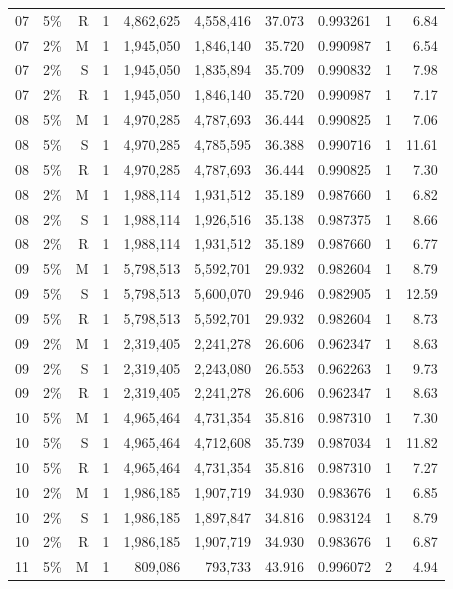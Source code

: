 \documentclass[10pt,a4paper]{article}
\begin{document}
\begin{longtable}{llrlrrrlrr}
07 & 5\% & R & 1 & 4,862,625 & 4,558,416 & 37.073 & 0.993261 & 1 & 6.84 \\
07 & 2\% & M & 1 & 1,945,050 & 1,846,140 & 35.720 & 0.990987 & 1 & 6.54 \\
07 & 2\% & S & 1 & 1,945,050 & 1,835,894 & 35.709 & 0.990832 & 1 & 7.98 \\
07 & 2\% & R & 1 & 1,945,050 & 1,846,140 & 35.720 & 0.990987 & 1 & 7.17 \\
08 & 5\% & M & 1 & 4,970,285 & 4,787,693 & 36.444 & 0.990825 & 1 & 7.06 \\
08 & 5\% & S & 1 & 4,970,285 & 4,785,595 & 36.388 & 0.990716 & 1 & 11.61 \\
08 & 5\% & R & 1 & 4,970,285 & 4,787,693 & 36.444 & 0.990825 & 1 & 7.30 \\
08 & 2\% & M & 1 & 1,988,114 & 1,931,512 & 35.189 & 0.987660 & 1 & 6.82 \\
08 & 2\% & S & 1 & 1,988,114 & 1,926,516 & 35.138 & 0.987375 & 1 & 8.66 \\
08 & 2\% & R & 1 & 1,988,114 & 1,931,512 & 35.189 & 0.987660 & 1 & 6.77 \\
09 & 5\% & M & 1 & 5,798,513 & 5,592,701 & 29.932 & 0.982604 & 1 & 8.79 \\
09 & 5\% & S & 1 & 5,798,513 & 5,600,070 & 29.946 & 0.982905 & 1 & 12.59 \\
09 & 5\% & R & 1 & 5,798,513 & 5,592,701 & 29.932 & 0.982604 & 1 & 8.73 \\
09 & 2\% & M & 1 & 2,319,405 & 2,241,278 & 26.606 & 0.962347 & 1 & 8.63 \\
09 & 2\% & S & 1 & 2,319,405 & 2,243,080 & 26.553 & 0.962263 & 1 & 9.73 \\
09 & 2\% & R & 1 & 2,319,405 & 2,241,278 & 26.606 & 0.962347 & 1 & 8.63 \\
10 & 5\% & M & 1 & 4,965,464 & 4,731,354 & 35.816 & 0.987310 & 1 & 7.30 \\
10 & 5\% & S & 1 & 4,965,464 & 4,712,608 & 35.739 & 0.987034 & 1 & 11.82 \\
10 & 5\% & R & 1 & 4,965,464 & 4,731,354 & 35.816 & 0.987310 & 1 & 7.27 \\
10 & 2\% & M & 1 & 1,986,185 & 1,907,719 & 34.930 & 0.983676 & 1 & 6.85 \\
10 & 2\% & S & 1 & 1,986,185 & 1,897,847 & 34.816 & 0.983124 & 1 & 8.79 \\
10 & 2\% & R & 1 & 1,986,185 & 1,907,719 & 34.930 & 0.983676 & 1 & 6.87 \\
11 & 5\% & M & 1 & 809,086 & 793,733 & 43.916 & 0.996072 & 2 & 4.94 \\

\end{longtable}
\end{document}

